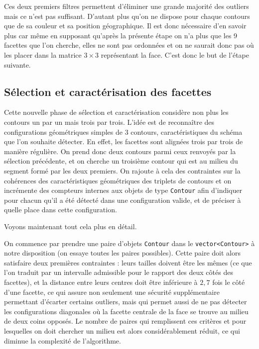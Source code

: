 \documentclass[a4paper,11pt]{article}
\begin{document}
Ces deux premiers filtres permettent d'éliminer une grande majorité des outliers mais ce n'est pas suffisant.
D'autant plus qu'on ne dispose pour chaque contours que de sa couleur et sa position géographique. Il est donc
nécessaire d'en savoir plus car même en supposant qu'après la présente étape on n'a plus que les 9 facettes que
l'on cherche, elles ne sont pas ordonnées et on ne saurait donc pas où les placer dans la matrice $3\times3$
représentant la face. C'est donc le but de l'étape suivante.

\subsection{Sélection et caractérisation des facettes}
Cette nouvelle phase de sélection et caractérisation considère non plus les contours un par un mais trois par
trois. L'idée est de reconnaître des configurations géométriques simples de 3 contours, caractéristiques du 
schéma que l'on souhaite détecter. En effet, les facettes sont alignées trois par trois de manière régulière.
On prend donc deux contours parmi ceux renvoyés par la sélection précédente, et on cherche un troisième contour
qui est au milieu du segment formé par les deux premiers. On rajoute à cela des contraintes sur la cohérences 
des caractéristiques géométriques des triplets de contours et on incrémente des compteurs internes aux objets
de type \verb|Contour| afin d'indiquer pour chacun qu'il a été détecté dans une configuration valide, et de
préciser à quelle place dans cette configuration.

Voyons maintenant tout cela plus en détail.

On commence par prendre une paire d'objets \verb|Contour| dans le \verb|vector<Contour>| à notre 
disposition (on essaye toutes les paires possibles). Cette paire doit alors satisfaire deux premières 
contraintes : leurs tailles doivent être les mêmes (ce que l'on traduit par un intervalle admissible pour le 
rapport des deux côtés des facettes), et la distance entre leurs centres doit être inférieure à $2,7$ fois le 
côté d'une facette, ce qui
assure non seulement une sécurité supplémentaire permettant d'écarter certains outliers, mais qui permet aussi
de ne pas détecter les configurations diagonales où la facette centrale de la face se trouve au milieu de deux
coins opposés. Le nombre de paires qui remplissent ces critères et pour lesquelles on doit chercher un milieu 
est alors considérablement réduit, ce qui diminue la complexité de l'algorithme.
\end{document}
